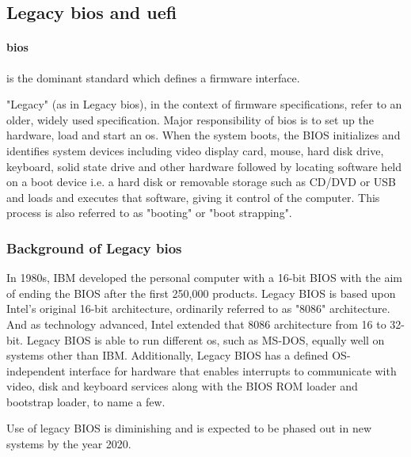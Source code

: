 \subsection{Legacy \gls{bios} and \gls{uefi}}

\paragraph{\gls{bios}} is the dominant standard which defines a firmware interface.

"Legacy" (as in Legacy \gls{bios}), in the context of firmware specifications, refer to an older, widely used specification. Major responsibility of \gls{bios} is to set up the hardware, load and start an \gls{os}. When the system boots, the BIOS initializes and identifies system devices including video display card, mouse, hard disk drive, keyboard, solid state drive and other hardware followed by locating software held on a boot device i.e. a hard disk or removable storage such as CD/DVD or USB and loads and executes that software, giving it control of the computer. This process is also referred to as "booting" or "boot strapping".

\subsubsection{Background of Legacy \gls{bios}}
In 1980s, IBM developed the personal computer with a 16-bit BIOS with the aim of ending the BIOS after the first 250,000 products. Legacy BIOS is based upon Intel's original 16-bit architecture, ordinarily referred to as  "8086" architecture. And as technology advanced, Intel extended that 8086 architecture from 16 to 32-bit.
Legacy BIOS is able to run different \gls{os}, such as MS-DOS, equally well on systems other than IBM. Additionally, Legacy BIOS has a defined OS-independent interface for hardware that enables interrupts to communicate with video, disk and keyboard services along with the BIOS ROM loader and bootstrap loader, to name a few.

Use of legacy BIOS is diminishing and is expected to be phased out in new systems by the year 2020.

